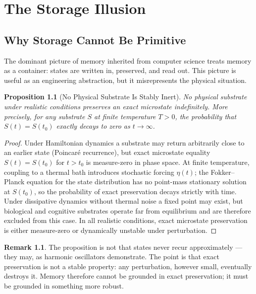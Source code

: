 \documentclass[12pt, oneside]{book}
\theoremstyle{plain}
\newtheorem{proposition}[theorem]{Proposition}
\theoremstyle{definition}
\newtheorem{remark}[theorem]{Remark}
\theoremstyle{remark}
\begin{document}
\chapter{The Storage Illusion}

\section{Why Storage Cannot Be Primitive}

The dominant picture of memory inherited from computer science
treats memory as a container: states are written in, preserved,
and read out.
This picture is useful as an engineering abstraction, but it
misrepresents the physical situation.

\begin{proposition}[No Physical Substrate Is Stably Inert]
\label{prop:no-inert}
No physical substrate under realistic conditions preserves
an exact microstate indefinitely.
More precisely, for any substrate $S$ at finite temperature
$T > 0$, the probability that $S(t) = S(t_0)$ exactly
decays to zero as $t \to \infty$.
\end{proposition}

\begin{proof}
Under Hamiltonian dynamics a substrate may return
arbitrarily close to an earlier state (Poincaré recurrence),
but exact microstate equality $S(t) = S(t_0)$ for $t > t_0$
is measure-zero in phase space.
At finite temperature, coupling to a thermal bath introduces
stochastic forcing $\eta(t)$; the Fokker--Planck equation
for the state distribution has no point-mass stationary
solution at $S(t_0)$, so the probability of exact
preservation decays strictly with time.
Under dissipative dynamics without thermal noise a fixed
point may exist, but biological and cognitive substrates
operate far from equilibrium and are therefore excluded
from this case.
In all realistic conditions, exact microstate preservation
is either measure-zero or dynamically unstable under
perturbation.
\end{proof}

\begin{remark}
The proposition is not that states never recur approximately
--- they may, as harmonic oscillators demonstrate.
The point is that exact preservation is not a stable property:
any perturbation, however small, eventually destroys it.
Memory therefore cannot be grounded in exact preservation;
it must be grounded in something more robust.
\end{remark}
\end{document}
